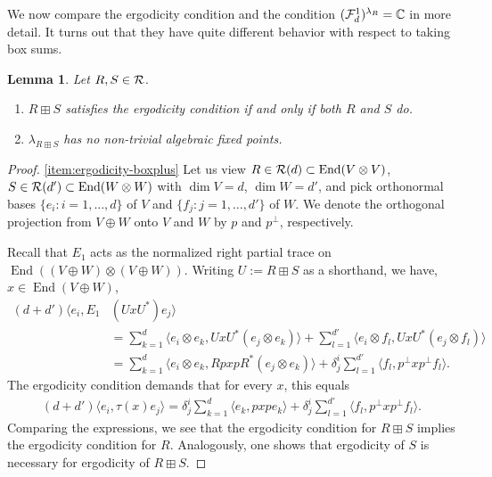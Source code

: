 \documentclass[12pt,a4paper]{amsart}
\numberwithin{equation}{section}
\newtheorem{lemma}[theorem]{Lemma}
\theoremstyle{remark}
\def\End{\operatorname{End}}
\def\dim{\operatorname{dim}}
\newcommand{\ot}{\otimes}
\newcommand{\Cl}{\mathbb{C}}
\newcommand{\la}{\lambda}
\begin{document}
We now compare the ergodicity condition and the condition $(\CF_d^1)^{\la_R}=\Cl$ in more detail. It turns out that they have quite different behavior with respect to taking box sums.

\begin{lemma}\label{lemma:boxplus-and-ergodicity}
    Let $R,S\in\mathcal{R}$.
    \begin{enumerate}
     \item\label{item:ergodicity-boxplus} $R\boxplus S$ satisfies the ergodicity condition if and only if both $R$ and $S$ do.
     \item\label{item:F1ergodicity-boxplus} $\la_{R\boxplus S}$ has no non-trivial algebraic fixed points.
    \end{enumerate}
\end{lemma}
\begin{proof}
    \ref{item:ergodicity-boxplus} Let us view $R\in\CR(d)\subset\End(V\ot V)$, $S\in\CR(d')\subset\End(W\ot W)$ with $\dim V=d$, $\dim W=d'$, and pick orthonormal bases $\{e_i:i=1,\ldots,d\}$ of $V$ and $\{f_j:j=1,\ldots,d'\}$ of $W$. We denote the orthogonal projection from $V\oplus W$ onto $V$ and $W$ by $p$ and $p^\perp$, respectively.
    
    Recall that $E_1$ acts as the normalized right partial trace on $\End((V\oplus W)\ot(V\oplus W))$. Writing $U:=R\boxplus S$ as a shorthand, we have, $x\in\End(V\oplus W)$,
    \begin{align*}
     (d+d')\langle e_i,E_1&(UxU^*)e_j\rangle
     \\
     &=
     \sum_{k=1}^d\langle e_i\ot e_k,UxU^*(e_j\ot e_k)\rangle
     +
     \sum_{l=1}^{d'}\langle e_i\ot f_l,UxU^*(e_j\ot f_l)\rangle
     \\
     &=
    \sum_{k=1}^d\langle e_i\ot e_k,RpxpR^*(e_j\ot e_k)\rangle
     +
     \delta^i_j\sum_{l=1}^{d'}\langle f_l,p^\perp xp^\perp f_l\rangle
     .
    \end{align*}
    The ergodicity condition demands that for every $x$, this equals 
    \begin{align*}
     (d+d')\langle e_i,\tau(x)e_j\rangle
     =
     \delta^i_j\sum_{k=1}^d\langle e_k,pxp e_k\rangle
     +
     \delta^i_j\sum_{l=1}^{d'}\langle f_l,p^\perp xp^\perp f_l\rangle
     .
    \end{align*}
    Comparing the expressions, we see that the ergodicity condition for $R\boxplus S$ implies the ergodicity condition for $R$. Analogously, one shows that ergodicity of $S$ is necessary for ergodicity of $R\boxplus S$.
    

\end{proof}
\end{document}
